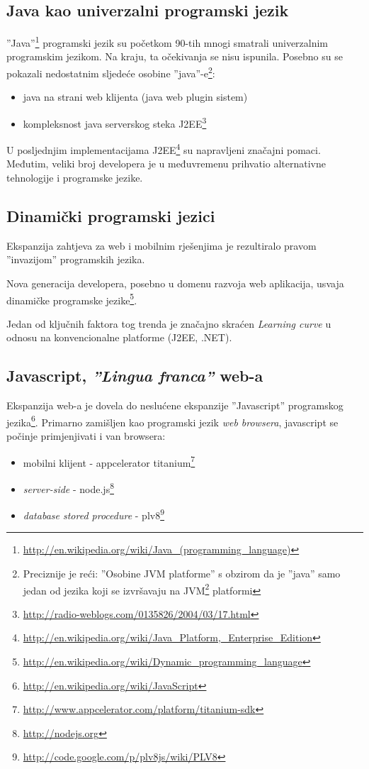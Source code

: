 \documentclass[times, utf8, seminar]{fit}
\begin{document}
\subsection{Java kao univerzalni programski jezik}

''Java''\footnote{\url{http://en.wikipedia.org/wiki/Java_(programming_language)}} programski jezik su početkom 90-tih mnogi smatrali univerzalnim programskim jezikom. Na kraju, ta očekivanja se nisu ispunila. Posebno su se pokazali nedostatnim sljedeće osobine ''java''-e\footnote{Preciznije je reći: ''Osobine JVM platforme'' s obzirom da je ''java'' samo jedan od jezika koji se izvršavaju na JVM\footnote{\url{http://en.wikipedia.org/wiki/Java_virtual_machine}} platformi}: 
\begin{itemize}
  \item java na strani web klijenta (java web plugin sistem)
  \item kompleksnost java serverskog steka J2EE\footnote{\url{http://radio-weblogs.com/0135826/2004/03/17.html}} 
\end{itemize}

U posljednjim implementacijama J2EE\footnote{\url{http://en.wikipedia.org/wiki/Java_Platform,_Enterprise_Edition}} su napravljeni značajni pomaci. Međutim, veliki broj developera je u međuvremenu prihvatio alternativne tehnologije i programske jezike.

\subsection{Dinamički programski jezici}

Ekspanzija zahtjeva za web i mobilnim rješenjima je rezultiralo pravom ''invazijom'' programskih jezika. 

Nova generacija developera, posebno u domenu razvoja web aplikacija, usvaja dinamičke programske jezike\footnote{\url{http://en.wikipedia.org/wiki/Dynamic_programming_language}}. 
 
Jedan od ključnih faktora tog trenda je značajno skraćen \emph{Learning curve} u odnosu na konvencionalne platforme (J2EE, .NET).

\subsection{Javascript, \emph{''Lingua franca''} web-a}

Ekspanzija web-a je dovela do neslućene ekspanzije ''Javascript'' programskog jezika\footnote{\url{http://en.wikipedia.org/wiki/JavaScript}}. Primarno zamišljen kao programski jezik \emph{web browsera}, javascript se počinje primjenjivati i van browsera:
\begin{itemize}
  \item mobilni klijent - appcelerator titanium\footnote{\url{http://www.appcelerator.com/platform/titanium-sdk}}
  \item \emph{server-side} - node.js\footnote{\url{http://nodejs.org}}
  \item \emph{database stored procedure} - plv8\footnote{\url{http://code.google.com/p/plv8js/wiki/PLV8}}
\end{itemize}
 
\end{document}
